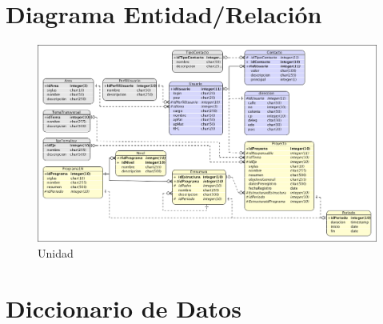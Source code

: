 \documentclass[10pt]{book}
\begin{document}

\section{Diagrama Entidad/Relación}

  	\begin{figure}[h!]
 		\centering
 			\includegraphics[width=.8\textwidth]{images/modeloER}
 		\caption{Unidad}
 	\end{figure}

\section{Diccionario de Datos}

\end{document}
